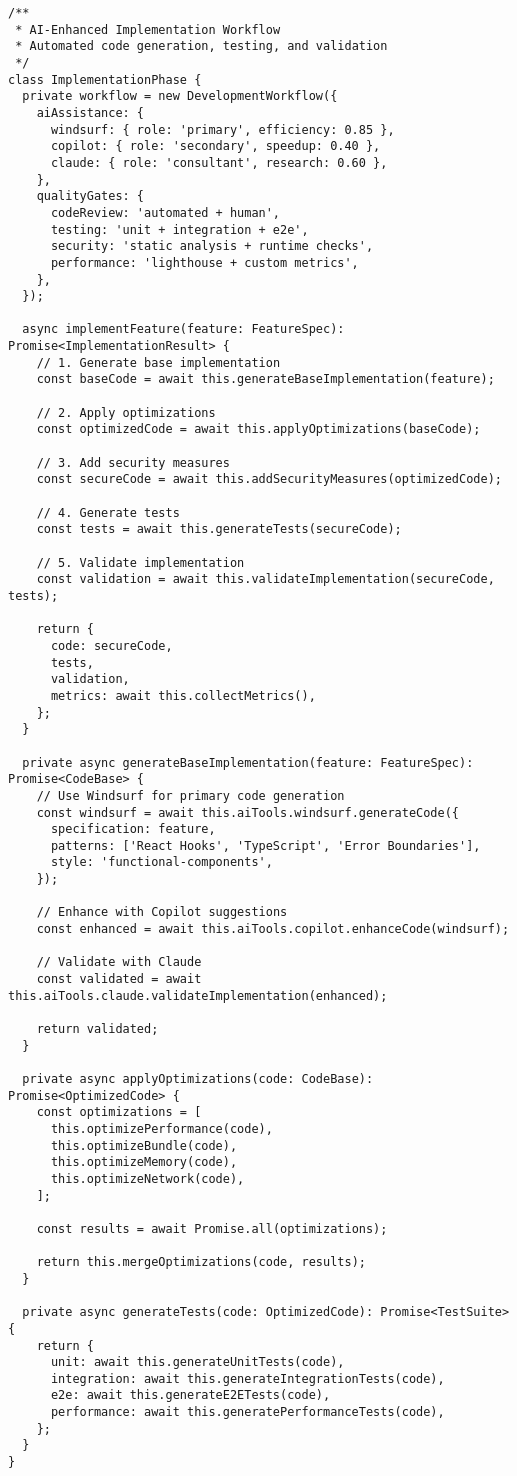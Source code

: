 \documentclass[11pt,a4paper]{article}
\begin{document}
\begin{lstlisting}[style=typescript, caption=Automated Development Workflow]
/**
 * AI-Enhanced Implementation Workflow
 * Automated code generation, testing, and validation
 */
class ImplementationPhase {
  private workflow = new DevelopmentWorkflow({
    aiAssistance: {
      windsurf: { role: 'primary', efficiency: 0.85 },
      copilot: { role: 'secondary', speedup: 0.40 },
      claude: { role: 'consultant', research: 0.60 },
    },
    qualityGates: {
      codeReview: 'automated + human',
      testing: 'unit + integration + e2e',
      security: 'static analysis + runtime checks',
      performance: 'lighthouse + custom metrics',
    },
  });

  async implementFeature(feature: FeatureSpec): Promise<ImplementationResult> {
    // 1. Generate base implementation
    const baseCode = await this.generateBaseImplementation(feature);

    // 2. Apply optimizations
    const optimizedCode = await this.applyOptimizations(baseCode);

    // 3. Add security measures
    const secureCode = await this.addSecurityMeasures(optimizedCode);

    // 4. Generate tests
    const tests = await this.generateTests(secureCode);

    // 5. Validate implementation
    const validation = await this.validateImplementation(secureCode, tests);

    return {
      code: secureCode,
      tests,
      validation,
      metrics: await this.collectMetrics(),
    };
  }

  private async generateBaseImplementation(feature: FeatureSpec): Promise<CodeBase> {
    // Use Windsurf for primary code generation
    const windsurf = await this.aiTools.windsurf.generateCode({
      specification: feature,
      patterns: ['React Hooks', 'TypeScript', 'Error Boundaries'],
      style: 'functional-components',
    });

    // Enhance with Copilot suggestions
    const enhanced = await this.aiTools.copilot.enhanceCode(windsurf);

    // Validate with Claude
    const validated = await this.aiTools.claude.validateImplementation(enhanced);

    return validated;
  }

  private async applyOptimizations(code: CodeBase): Promise<OptimizedCode> {
    const optimizations = [
      this.optimizePerformance(code),
      this.optimizeBundle(code),
      this.optimizeMemory(code),
      this.optimizeNetwork(code),
    ];

    const results = await Promise.all(optimizations);
    
    return this.mergeOptimizations(code, results);
  }

  private async generateTests(code: OptimizedCode): Promise<TestSuite> {
    return {
      unit: await this.generateUnitTests(code),
      integration: await this.generateIntegrationTests(code),
      e2e: await this.generateE2ETests(code),
      performance: await this.generatePerformanceTests(code),
    };
  }
}
\end{lstlisting}
\end{document}
